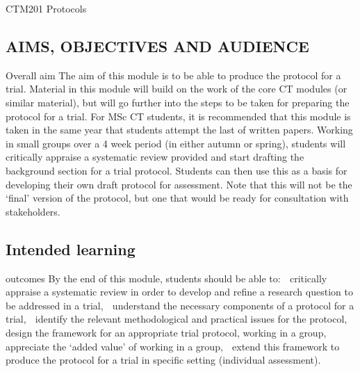 CTM201 Protocols


\subsection{AIMS, OBJECTIVES AND AUDIENCE}
Overall aim The aim of this module is to be able to produce the protocol for a trial. Material
in this module will build on the work of the core CT modules (or similar
material), but will go further into the steps to be taken for preparing the
protocol for a trial. For MSc CT students, it is recommended that this module is
taken in the same year that students attempt the last of written papers.
Working in small groups over a 4 week period (in either autumn or spring),
students will critically appraise a systematic review provided and start drafting
the background section for a trial protocol. Students can then use this as a basis
for developing their own draft protocol for assessment. Note that this will not
be the ‘final’ version of the protocol, but one that would be ready for
consultation with stakeholders.
\subsection{Intended learning}
outcomes
By the end of this module, students should be able to:
 critically appraise a systematic review in order to develop and refine a
research question to be addressed in a trial,
 understand the necessary components of a protocol for a trial,
 identify the relevant methodological and practical issues for the protocol,
 design the framework for an appropriate trial protocol, working in a group,
 appreciate the ‘added value’ of working in a group,
 extend this framework to produce the protocol for a trial in specific setting
(individual assessment).
